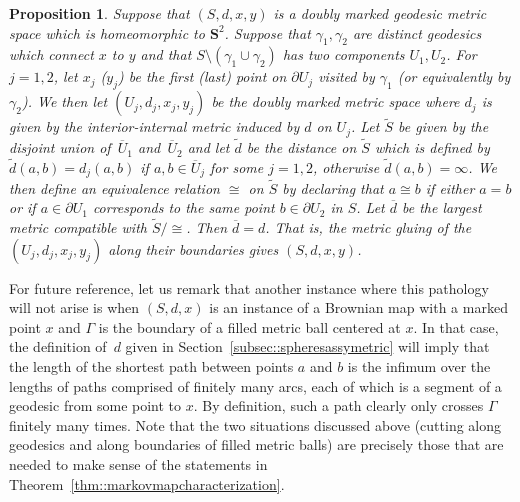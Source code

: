 \documentclass[JEP,XML,SOM,Unicode]{cedram}
\theoremstyle{plain}
\numberwithin{theorem}{section}
\newtheorem{proposition}[theorem]{Proposition}
\theoremstyle{definition}
\renewcommand{\S}{{\mathbf S}}
\let\ol\overline
\let\wt\widetilde
\begin{document}
\begin{proposition}
\label{prop::recover_sphere}
Suppose that $(S,d,x,y)$ is a doubly marked geodesic metric space which is homeomorphic to $\S^2$. Suppose that $\gamma_1,\gamma_2$ are distinct geodesics which connect $x$ to $y$ and that $S \setminus (\gamma_1 \cup \gamma_2)$ has two components $U_1,U_2$. For $j=1,2$, let $x_j$ (\resp $y_j$) be the first (\resp last) point on $\partial U_j$ visited by $\gamma_1$ (or equivalently by $\gamma_2$). We then let $(U_j,d_j,x_j,y_j)$ be the doubly marked metric space where $d_j$ is given by the interior-internal metric induced by $d$ on $U_j$. Let $\wt{S}$ be given by the disjoint union of~$\ol{U}_1$ and~$\ol{U}_2$ and let $\wt{d}$ be the distance on $\wt{S}$ which is defined by $\wt{d}(a,b) = d_j(a,b)$ if $a,b \in \ol{U}_j$ for some $j=1,2$, otherwise $\wt{d}(a,b) = \infty$. We then define an equivalence relation $\cong$ on $\wt{S}$ by declaring that $a \cong b$ if either $a=b$ or if $a \in \partial U_1$ corresponds to the same point $b \in \partial U_2$ in $S$. Let $\ol{d}$ be the largest metric compatible with $\wt{S}/\cong$. Then $\ol{d} = d$. That is, the metric gluing of the $(U_j,d_j,x_j,y_j)$ along their boundaries gives $(S,d,x,y)$.
\end{proposition}

For future reference, let us remark that another instance where this pathology will not arise is when $(S,d,x)$ is an instance of a Brownian map with a marked point $x$ and $\Gamma$ is the boundary of a filled metric ball centered at $x$. In that case, the definition of~$d$ given in Section~\ref{subsec::spheresassymetric} will imply that the length of the shortest path between points $a$ and $b$ is the infimum over the lengths of paths comprised of finitely many arcs, each of which is a segment of a geodesic from some point to $x$. By definition, such a path clearly only crosses $\Gamma$ finitely many times. Note that the two situations discussed above (cutting along geodesics and along boundaries of filled metric balls) are precisely those that are needed to make sense of the statements in Theorem~\ref{thm::markovmapcharacterization}.
\end{document}

